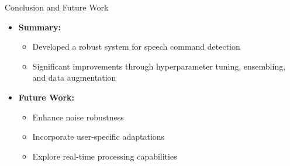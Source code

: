 \documentclass{beamer}
\begin{document}
\begin{frame}{Conclusion and Future Work}
  \begin{itemize}
    \item \textbf{Summary:}
      \begin{itemize}
        \item Developed a robust system for speech command detection
        \item Significant improvements through hyperparameter tuning, ensembling, and data augmentation
      \end{itemize}
    \item \textbf{Future Work:}
      \begin{itemize}
        \item Enhance noise robustness
        \item Incorporate user-specific adaptations
        \item Explore real-time processing capabilities
      \end{itemize}
  \end{itemize}
\end{frame}
\end{document}
